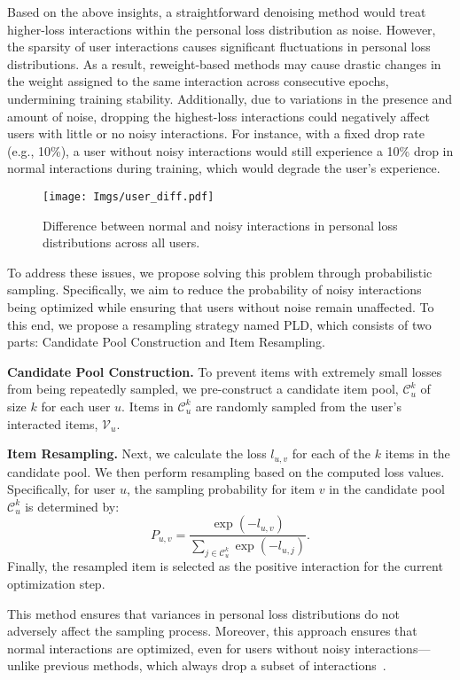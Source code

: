 Based on the above insights, a straightforward denoising method would treat higher-loss interactions within the personal loss distribution as noise. However, the sparsity of user interactions causes significant fluctuations in personal loss distributions. As a result, reweight-based methods may cause drastic changes in the weight assigned to the same interaction across consecutive epochs, undermining training stability. Additionally, due to variations in the presence and amount of noise, dropping the highest-loss interactions could negatively affect users with little or no noisy interactions. For instance, with a fixed drop rate (e.g., 10\%), a user without noisy interactions would still experience a 10\% drop in normal interactions during training, which would degrade the user's experience.


\begin{figure}
    \centering
    \texttt{[image: Imgs/user\_diff.pdf]}
    \caption{Difference between normal and noisy interactions in personal loss distributions across all users.}
    \label{fig:user_diff}
\end{figure}



To address these issues, we propose solving this problem through probabilistic sampling. Specifically, we aim to reduce the probability of noisy interactions being optimized while ensuring that users without noise remain unaffected. To this end, we propose a resampling strategy named PLD, which consists of two parts: Candidate Pool Construction and Item Resampling.

\textbf{Candidate Pool Construction.} To prevent items with extremely small losses from being repeatedly sampled, we pre-construct a candidate item pool, $\mathcal{C}_{u}^{k}$ of size $k$ for each user $u$. Items in $\mathcal{C}_{u}^{k}$ are randomly sampled from the user's interacted items, $\mathcal{V}_{u}$.

\textbf{Item Resampling.} Next, we calculate the loss $l_{u,v}$ for each of the $k$ items in the candidate pool. We then perform resampling based on the computed loss values. Specifically, for user $u$, the sampling probability for item $v$ in the candidate pool $\mathcal{C}_{u}^{k}$ is determined by:
\begin{equation}
\label{eq:p_i}
    P_{u, v} = \frac{\exp(-l_{u,v})}{\sum_{j \in \mathcal{C}_{u}^{k}} \exp(-l_{u,j})}.
\end{equation}
Finally, the resampled item is selected as the positive interaction for the current optimization step.

This method ensures that variances in personal loss distributions do not adversely affect the sampling process. Moreover, this approach ensures that normal interactions are optimized, even for users without noisy interactions—unlike previous methods, which always drop a subset of interactions~\cite{wang2021denoising, he2024double}.


